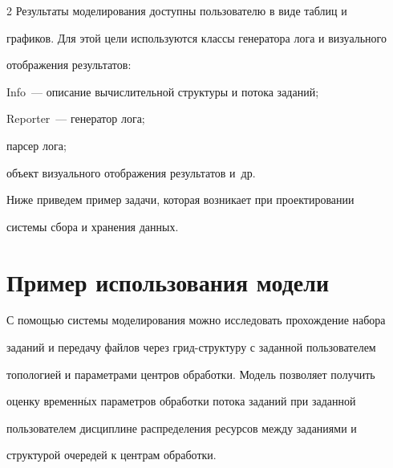 \begin{multicols}{2}
   Результаты моделирования доступны пользователю в виде таблиц и 


графиков. Для этой цели используются классы генератора лога и визуального 


отображения результатов:






Info~--- описание вы\-чис\-ли\-тель\-ной структуры и потока заданий;




Reporter~--- генератор лога;




парсер лога;




объект визуального отображения результатов и~др.







   Ниже приведем пример задачи, которая возникает при проектировании 


системы сбора и хранения данных. 





\section{Пример использования модели}





   С помощью системы моделирования можно исследовать прохождение набора 


заданий и передачу файлов через грид-струк\-ту\-ру с заданной пользователем 


топологией и параметрами центров обработки. Модель позволяет получить 


оценку временн$\acute{\mbox{ы}}$х параметров обработки потока заданий при заданной 


пользователем дисциплине распределения ресурсов между заданиями и 


структурой очередей к центрам обработки.


   



\end{multicols}
